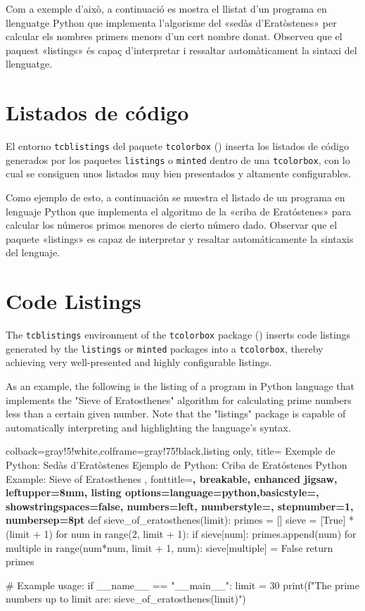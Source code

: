   Com a exemple d'això, a continuació es mostra el llistat d'un programa en llenguatge Python que implementa l'algorisme del «sedàs d'Eratòstenes» per calcular els nombres primers menors d'un cert nombre donat. Observeu que el paquest «listings» és capaç d'interpretar i ressaltar automàticament la sintaxi del llenguatge.
\or
  \section{Listados de código}

  El entorno \texttt{tcblistings} del paquete \texttt{tcolorbox} (\cite{tcolorbox}) inserta los listados de código generados por los paquetes \texttt{listings} o \texttt{minted} dentro de una \texttt{tcolorbox}, con lo cual se consiguen unos listados muy bien presentados y altamente configurables.

  Como ejemplo de esto, a continuación se muestra el listado de un programa en lenguaje Python que implementa el algoritmo de la «criba de Eratóstenes» para calcular los números primos menores de cierto número dado. Observar que el paquete «listings» es capaz de interpretar y resaltar automáticamente la sintaxis del lenguaje.
\else
  \section{Code Listings}

  The \texttt{tcblistings} environment of the \texttt{tcolorbox} package (\cite{tcolorbox}) inserts code listings generated by the \texttt{listings} or \texttt{minted} packages into a \texttt{tcolorbox}, thereby achieving very well-presented and highly con\-fi\-gu\-ra\-ble listings.

  As an example, the following is the listing of a program in Python language that implements the "Sieve of Eratosthenes" algorithm for calculating prime numbers less than a certain given number. Note that the "listings" package is capable of automatically interpreting and highlighting the language's syntax.
\fi

\newcommand\ListTitle{\ifcase\doclanguage\or
  Exemple de Python: Sedàs d'Eratòstenes\or
  Ejemplo de Python: Criba de Eratóstenes\else
  Python Example: Sieve of Eratosthenes\fi
}
\begin{tcblisting}{colback=gray!5!white,colframe=gray!75!black,listing only,
    title=\ListTitle, fonttitle=\bfseries, breakable, enhanced jigsaw, leftupper=8mm,
    listing options={language=python,basicstyle=\ttfamily\small,
    showstringspaces=false, numbers=left, numberstyle=\footnotesize, stepnumber=1, numbersep=8pt}}
def sieve_of_eratosthenes(limit):
  primes = []
  sieve = [True] * (limit + 1)
  for num in range(2, limit + 1):
    if sieve[num]:
      primes.append(num)
      for multiple in range(num*num, limit + 1, num):
        sieve[multiple] = False
  return primes

# Example usage:
if __name__ == "__main__":
  limit = 30
  print(f"The prime numbers up to {limit} are:
          {sieve_of_eratosthenes(limit)}")
\end{tcblisting}

